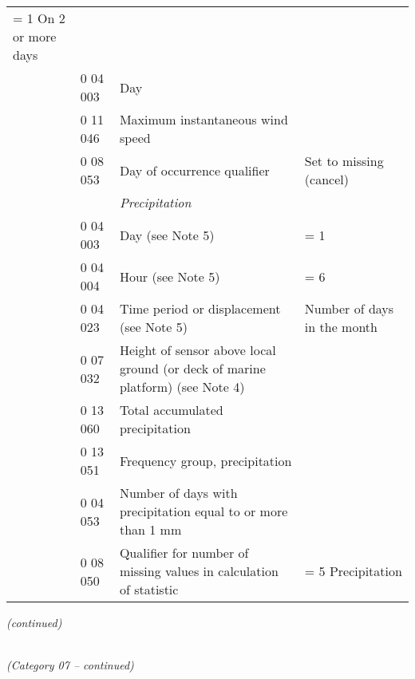 \begin{longtable}[]{@{}llll@{}}
\begin{minipage}[t]{0.22\columnwidth}
= 1 On 2 or more days\strut
\end{minipage}\tabularnewline
& 0 04 003 & Day &\tabularnewline
& 0 11 046 & Maximum instantaneous wind speed &\tabularnewline
& 0 08 053 & Day of occurrence qualifier & Set to missing (cancel)\tabularnewline
& & \emph{Precipitation} &\tabularnewline
& 0 04 003 & Day (see Note 5) & = 1\tabularnewline
& 0 04 004 & Hour (see Note 5) & = 6\tabularnewline
& 0 04 023 & Time period or displacement (see Note 5) & Number of days in the month\tabularnewline
& 0 07 032 & Height of sensor above local ground (or deck of marine platform) (see Note 4) &\tabularnewline
& 0 13 060 & Total accumulated precipitation &\tabularnewline
& 0 13 051 & Frequency group, precipitation &\tabularnewline
& 0 04 053 & Number of days with precipitation equal to or more than 1 mm &\tabularnewline
& 0 08 050 & Qualifier for number of missing values in calculation of statistic & = 5 Precipitation\tabularnewline
\bottomrule
\end{longtable}

\emph{(continued)}

\emph{\\
(Category 07 -- continued)}

